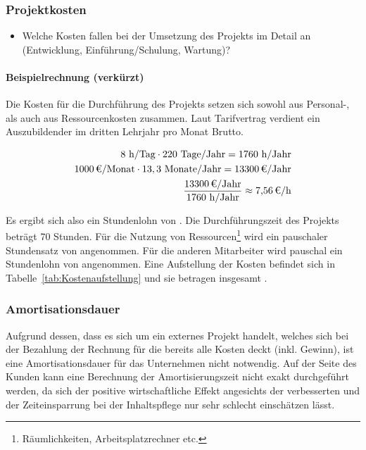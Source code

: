 \subsubsection{Projektkosten}
\label{sec:Projektkosten}
\begin{itemize}
	\item Welche Kosten fallen bei der Umsetzung des Projekts im Detail an (\zB Entwicklung, Einführung/Schulung, Wartung)?
\end{itemize}

\paragraph{Beispielrechnung (verkürzt)}
Die Kosten für die Durchführung des Projekts setzen sich sowohl aus Personal-, als auch aus Ressourcenkosten zusammen.
Laut Tarifvertrag verdient ein Auszubildender im dritten Lehrjahr pro Monat  Brutto. 

\begin{eqnarray}
8 \mbox{ h/Tag} \cdot 220 \mbox{ Tage/Jahr} = 1760 \mbox{ h/Jahr}\\
\eur{1000}\mbox{/Monat} \cdot 13,3 \mbox{ Monate/Jahr} = \eur{13300} \mbox{/Jahr}\\
\frac{\eur{13300} \mbox{/Jahr}}{1760 \mbox{ h/Jahr}} \approx \eur{7,56}\mbox{/h}
\end{eqnarray}

Es ergibt sich also ein Stundenlohn von . 
Die Durchführungszeit des Projekts beträgt 70 Stunden. Für die Nutzung von Ressourcen\footnote{Räumlichkeiten, Arbeitsplatzrechner etc.} wird 
ein pauschaler Stundensatz von  angenommen. Für die anderen Mitarbeiter wird pauschal ein Stundenlohn von  angenommen. 
Eine Aufstellung der Kosten befindet sich in Tabelle~\ref{tab:Kostenaufstellung} und sie betragen insgesamt .


\subsubsection{Amortisationsdauer}
\label{sec:Amortisationsdauer}

Aufgrund dessen, dass es sich um ein externes Projekt handelt, welches sich bei
der Bezahlung der Rechnung für die \mh bereits alle Kosten deckt (inkl. Gewinn), ist
eine Amortisationsdauer für das Unternehmen nicht notwendig.
Auf der Seite des Kunden kann eine Berechnung der Amortisierungszeit nicht exakt
durchgeführt werden, da sich der positive wirtschaftliche Effekt angesichts der
verbesserten  und der Zeiteinsparrung bei der
Inhaltspflege nur sehr schlecht einschätzen lässt.


